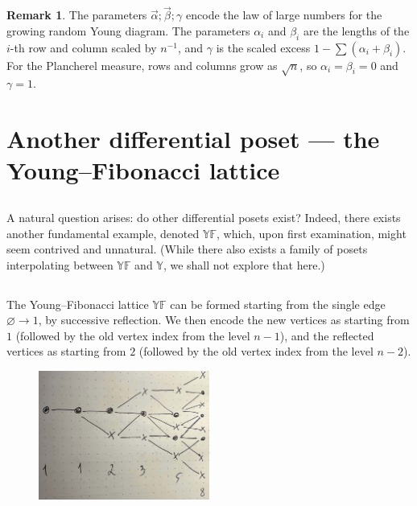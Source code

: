 \documentclass[letterpaper,11pt,oneside,reqno]{article}
\numberwithin{equation}{section}
\theoremstyle{definition}
\newtheorem{remark}[proposition]{Remark}
\begin{document}
\begin{remark}
	The parameters $\vec \alpha;\vec \beta;\gamma$ encode the law of large
	numbers for the growing random Young diagram.
	The parameters $\alpha_i$ and $\beta_i$ are the lengths of the $i$-th row and column
	scaled by $n^{-1}$,
	and $\gamma$ is the scaled excess $1-\sum(\alpha_i+\beta_i)$. For
	the Plancherel measure, rows and columns grow as $\sqrt n$,
	so $\alpha_i=\beta_i=0$ and $\gamma=1$.
\end{remark}


\section{Another differential poset --- the Young--Fibonacci lattice}

\subsection{}

A natural question arises: do other differential posets exist?
Indeed, there exists another fundamental example, denoted $\mathbb{YF}$, which, upon first examination,
might seem contrived and unnatural.
(While there also
exists a family of posets interpolating between
$\mathbb{YF}$ and $\mathbb{Y}$, we shall not explore that
here.)

\subsection{}

The Young--Fibonacci lattice $\mathbb{YF}$
can be formed starting from the single edge $\varnothing\to 1$,
by successive reflection. We then encode the new vertices as starting from $1$ (followed by the
old vertex index from the level $n-1$), and the
reflected vertices as starting from $2$ (followed by the
old vertex index from the level $n-2$).

\begin{figure}[htp]
	\centering
	\includegraphics[width=0.5\textwidth]{YF}
\end{figure}
\end{document}
